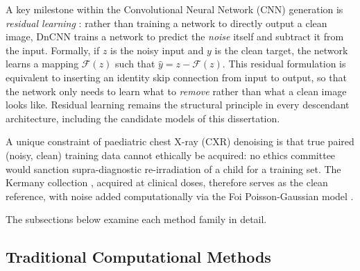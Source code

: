 \documentclass[12pt, a4paper, twoside, openright]{book}
\begin{document}
A key milestone within the Convolutional Neural Network (CNN) generation is \emph{residual learning} \cite{he_deep_2016}: rather than training a network to directly output a clean image, DnCNN \cite{zhang_beyond_2017} trains a network to predict the \emph{noise} itself and subtract it from the input. Formally, if $z$ is the noisy input and $y$ is the clean target, the network learns a mapping $\mathcal{F}(z)$ such that $\hat{y} = z - \mathcal{F}(z)$. This residual formulation is equivalent to inserting an identity skip connection from input to output, so that the network only needs to learn what to \emph{remove} rather than what a clean image looks like. Residual learning remains the structural principle in every descendant architecture, including the candidate models of this dissertation.

A unique constraint of paediatric chest X-ray (CXR) denoising is that true paired (noisy, clean) training data cannot ethically be acquired: no ethics committee would sanction supra-diagnostic re-irradiation of a child for a training set. The Kermany collection \cite{kermany_identifying_2018}, acquired at clinical doses, therefore serves as the clean reference, with noise added computationally via the Foi Poisson-Gaussian model \cite{foi_practical_2008}.

The subsections below examine each method family in detail.

\subsection{Traditional Computational Methods}
\label{sec:intro:existing:classical}
\end{document}
